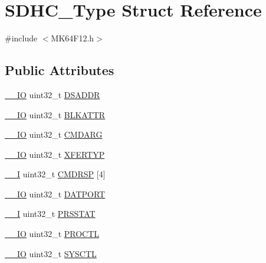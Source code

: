 \hypertarget{structSDHC__Type}{}\section{S\+D\+H\+C\+\_\+\+Type Struct Reference}
\label{structSDHC__Type}


{\ttfamily \#include $<$M\+K64\+F12.\+h$>$}

\subsection*{Public Attributes}
\begin{DoxyCompactItemize}
\item 
\hyperlink{core__sc300_8h_aec43007d9998a0a0e01faede4133d6be}{\+\_\+\+\_\+\+IO} uint32\+\_\+t \hyperlink{structSDHC__Type_ac1199644a3e0befa110f6f40108cd873}{D\+S\+A\+D\+DR}
\item 
\hyperlink{core__sc300_8h_aec43007d9998a0a0e01faede4133d6be}{\+\_\+\+\_\+\+IO} uint32\+\_\+t \hyperlink{structSDHC__Type_abf0771f8bc90488939e8feccbcd04a17}{B\+L\+K\+A\+T\+TR}
\item 
\hyperlink{core__sc300_8h_aec43007d9998a0a0e01faede4133d6be}{\+\_\+\+\_\+\+IO} uint32\+\_\+t \hyperlink{structSDHC__Type_a817fe46317500419bff67ebd2ec8f10d}{C\+M\+D\+A\+RG}
\item 
\hyperlink{core__sc300_8h_aec43007d9998a0a0e01faede4133d6be}{\+\_\+\+\_\+\+IO} uint32\+\_\+t \hyperlink{structSDHC__Type_aaf15f447a947396dffb6b71383e99170}{X\+F\+E\+R\+T\+YP}
\item 
\hyperlink{core__sc300_8h_af63697ed9952cc71e1225efe205f6cd3}{\+\_\+\+\_\+I} uint32\+\_\+t \hyperlink{structSDHC__Type_a85980d734764e8377f00179befd75336}{C\+M\+D\+R\+SP} \mbox{[}4\mbox{]}
\item 
\hyperlink{core__sc300_8h_aec43007d9998a0a0e01faede4133d6be}{\+\_\+\+\_\+\+IO} uint32\+\_\+t \hyperlink{structSDHC__Type_a18afc87de959a20b1ee89d3987dd2193}{D\+A\+T\+P\+O\+RT}
\item 
\hyperlink{core__sc300_8h_af63697ed9952cc71e1225efe205f6cd3}{\+\_\+\+\_\+I} uint32\+\_\+t \hyperlink{structSDHC__Type_ad259cb56a5f2395fb1c29bf23ad45586}{P\+R\+S\+S\+T\+AT}
\item 
\hyperlink{core__sc300_8h_aec43007d9998a0a0e01faede4133d6be}{\+\_\+\+\_\+\+IO} uint32\+\_\+t \hyperlink{structSDHC__Type_aff7ce95313465bc87dc72f0411e364dd}{P\+R\+O\+C\+TL}
\item 
\hyperlink{core__sc300_8h_aec43007d9998a0a0e01faede4133d6be}{\+\_\+\+\_\+\+IO} uint32\+\_\+t \hyperlink{structSDHC__Type_ab90a257351d9e9d361f51bcbe48e84e4}{S\+Y\+S\+C\+TL}

\end{DoxyCompactItemize}
